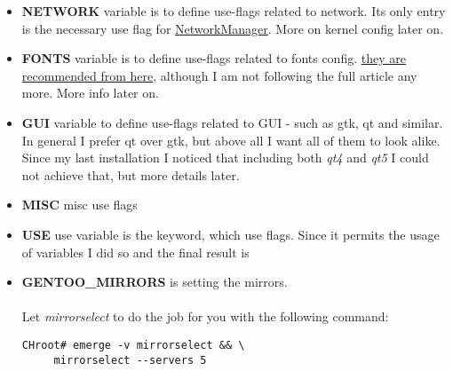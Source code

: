 \documentclass[10pt,a4paper]{article}
\begin{document}
\begin{itemize}
                \item \textbf{NETWORK} variable is to define use-flags related to network. Its only entry is the necessary use flag for \href{https://wiki.gentoo.org/wiki/NetworkManager#Installation}{NetworkManager}. More on kernel config later on.
                


                \item \textbf{FONTS} variable is to define use-flags related to fonts config. \href{http://kev009.com/wp/2009/12/getting-beautiful-fonts-in-gentoo-linux/}{they are recommended from here}, although I am not following the full article any more. More info later on. 
                


                \item \textbf{GUI} variable to define use-flags related to GUI - such as gtk, qt and similar. In general I prefer qt over gtk, but above all I want all of them to look alike. Since my last installation I noticed that including both \textit{qt4} and \textit{qt5} I could not achieve that, but more details later.
                


                \item \textbf{MISC} misc use flags
                


                \item \textbf{USE} use variable is the keyword, which use flags. Since it permits the usage of variables I did so and the final result is
                

                
                \item \textbf{GENTOO\_MIRRORS} is setting the mirrors. 
                

                
                    \paragraph{} Let \textit{mirrorselect} to do the job for you with the following command:
                
\begin{lstlisting}[style=BashInputCHRoot]
 CHroot# emerge -v mirrorselect && \
     mirrorselect --servers 5
\end{lstlisting}            
    
        \end{itemize}
	
\end{document}
